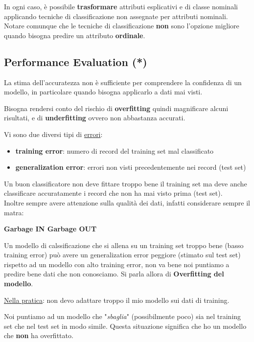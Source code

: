 In ogni caso, è possibile \textbf{trasformare} attributi esplicativi e di classe nominali applicando tecniche di classificazione non assegnate per attributi nominali. Notare comunque che le tecniche di classificazione \textbf{non} sono l'opzione migliore quando bisogna predire un attributo \textbf{ordinale}.

\subsection{Performance Evaluation (*)}
La stima dell'accuratezza non \`e sufficiente per comprendere la confidenza di un modello, in particolare quando bisogna applicarlo a dati mai visti.

Bisogna rendersi conto del rischio di \textbf{overfitting} quindi magnificare alcuni risultati, e di \textbf{underfitting} ovvero non abbastanza accurati.

Vi sono due diversi tipi di \underline{errori}:
\begin{itemize}
	\item \textbf{training error}: numero di record del training set mal classificato
	\item \textbf{generalization error}: errori non visti precedentemente nei record (test set)
\end{itemize}
Un buon classificatore non deve fittare troppo bene il training set ma deve anche classificare accuratamente i record che non ha mai visto prima (test set).\\

Inoltre sempre avere attenzione sulla qualit\`a dei dati, infatti considerare sempre il matra:
 
\textbf{Garbage IN Garbage OUT}\\

\begin{defn}
	Un modello di calssificazione che si allena su un training set troppo bene (basso training error) può avere un generalization error peggiore (stimato sul test set) rispetto ad un modello con alto training error, non va bene noi puntiamo a predire bene dati che non conosciamo. Si parla allora di \textbf{Overfitting del modello}.
\end{defn}

\underline{Nella pratica}: non devo adattare troppo il mio modello sui dati di training. 

Noi puntiamo ad un modello che "\textit{sbaglia}" (possibilmente poco) sia nel training set che nel test set in modo simile. Questa situazione significa che ho un modello che \textbf{non} ha overfittato. 

